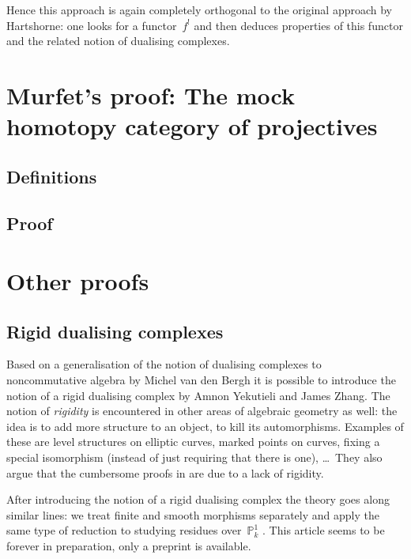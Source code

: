 \documentclass[10pt,a4paper]{article}
\begin{document}
Hence this approach is again completely orthogonal to the original approach by Hartshorne: one looks for a functor~$f^!$ and then deduces properties of this functor and the related notion of dualising complexes.

\section{Murfet's proof: The mock homotopy category of projectives}
\label{section:murfet}
\subsection{Definitions}
\label{subsection:definitions}

\subsection{Proof}
\label{subsection:proof}

\section{Other proofs}
\label{section:other}
\subsection{Rigid dualising complexes}
\label{subsection:yekutieli-zhang}
Based on a generalisation of the notion of dualising complexes to noncommutative algebra \cite{van-den-bergh-dualizing-complexes} by Michel van den Bergh it is possible to introduce the notion of a rigid dualising complex \cite{yekutieli-zhang-rigid-dualizing-complexes} by Amnon Yekutieli and James Zhang. The notion of \emph{rigidity} is encountered in other areas of algebraic geometry as well: the idea is to add more structure to an object, to kill its automorphisms. Examples of these are level structures on elliptic curves, marked points on curves, fixing a special isomorphism (instead of just requiring that there is one), \ldots\ They also argue that the cumbersome proofs in \cite{hartshorne-residues-and-duality} are due to a lack of rigidity.

After introducing the notion of a rigid dualising complex the theory goes along similar lines: we treat finite and smooth morphisms separately and apply the same type of reduction to studying residues over~$\mathbb{P}_k^1$ \cite{yekutieli-zhang-rigid-dualizing-complexes-on-schemes}. This article seems to be forever in preparation, only a preprint is available.
\end{document}
